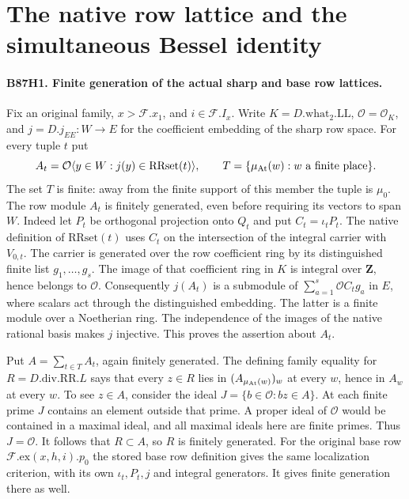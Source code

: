 \section{The native row lattice and the simultaneous Bessel identity}

\paragraph{B87H1. Finite generation of the actual sharp and base row lattices.}
Fix an original family, $x>\mathcal F.x_1$, and $i\in\mathcal F.I_x$.
Write $K=D.\mathrm{what}_2.\mathrm{LL}$, $\mathcal O=\mathcal O_K$,
and $j=D.j_{EE}:W\longrightarrow E$ for the coefficient embedding of the
sharp row space. For every tuple $t$ put
\[
 A_t=\mathcal O\langle y\in W:j(y)\in\mathrm{RRset}(t)\rangle,
 \qquad T=\{\mu_{\rm At}(w):w\text{ a finite place}\}.
\]
The set $T$ is finite: away from the finite support of this member
the tuple is $\mu_0$. The row module $A_t$ is finitely generated, even
before requiring its vectors to span $W$. Indeed let $P_t$ be orthogonal
projection onto $Q_t$ and put $C_t=\iota_tP_t$. The native definition
of $\mathrm{RRset}(t)$ uses $C_t$ on the intersection of the integral
carrier with $V_{0,t}$. The carrier is generated over the row
coefficient ring by its distinguished finite list $g_1,\dots,g_s$.
The image of that coefficient ring in $K$ is integral over
$\mathbf Z$, hence belongs to $\mathcal O$. Consequently
$j(A_t)$ is a submodule of $\sum_{a=1}^s\mathcal O C_tg_a$ in $E$,
where scalars act through the distinguished embedding. The latter is
a finite module over a Noetherian ring. The independence of the
images of the native rational basis makes $j$ injective. This proves
the assertion about $A_t$.

Put $A=\sum_{t\in T}A_t$, again finitely generated. The defining
family equality for $R=D.\mathrm{div}.\mathrm{RR}.L$ says that every
$z\in R$ lies in $(A_{\mu_{\rm At}(w)})_w$ at every $w$, hence in
$A_w$ at every $w$. To see $z\in A$, consider the ideal
$J=\{b\in\mathcal O:bz\in A\}$. At each finite prime $J$ contains
an element outside that prime. A proper ideal of $\mathcal O$
would be contained in a maximal ideal, and all maximal ideals here
are finite primes. Thus $J=\mathcal O$. It follows that $R\subset A$,
so $R$ is finitely generated. For the original base row
$\mathcal F.\mathrm{ex}(x,h,i).p_0$ the stored base row
definition gives the same localization criterion, with its own
$\iota_t,P_t,j$ and integral generators. It gives finite
generation there as well.

